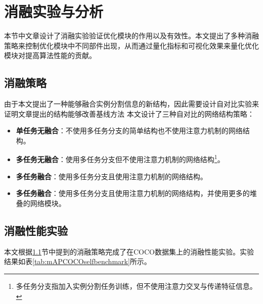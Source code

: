 

\section{消融实验与分析}
\label{sec:ablation}
本节中文章设计了消融实验验证优化模块的作用以及有效性。本文提出了多种消融策略来控制优化模块中不同部件出现，从而通过量化指标和可视化效果来量化优化模块对提高算法性能的贡献。
\subsection{消融策略}
\label{subsec:selfstrategy}
由于本文提出了一种能够融合实例分割信息的新结构，因此需要设计自对比实验来证明文章提出的结构能够改善基线方法
本文设计了三种自对比的网络结构策略：
\begin{itemize}
	\item \textbf{单任务无融合}：不使用多任务分支的简单结构也不使用注意力机制的网络结构。
	\item \textbf{多任务无融合}：使用多任务分支但不使用注意力机制的网络结构\footnote{多任务分支指加入实例分割任务训练，但不使用注意力交叉与传递特征信息。}。
	\item \textbf{多任务融合}：使用多任务分支且使用注意力机制的网络结构。
	\item \textbf{多任务融合}：使用多任务分支且使用注意力机制的网络结构，并使用更多的堆叠的网络模块。
\end{itemize}

\subsection{消融性能实验}
\label{subsec:selfeval}

本文根据\ref{subsec:selfstrategy}节中提到的消融策略完成了在COCO数据集上的消融性能实验。实验结果如表\ref{tab:mAPCOCOselfbenchmark}所示。

